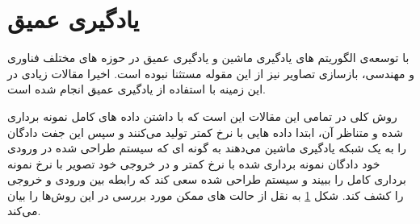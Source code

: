 \FloatBarrier
\section{یادگیری عمیق}\label{ch:literature-review|sec:deep-learning}


با توسعه‌ی الگوریتم های یادگیری ماشین و یادگیری عمیق در حوزه های مختلف فناوری و مهندسی، بازسازی تصاویر \mri نیز از این مقوله مستثنا نبوده است. اخیرا مقالات زیادی در این زمینه با استفاده از یادگیری عمیق انجام شده است. 

\begin{figure}[t!]
	\centering
	\begin{copyrightBox}{\linewidth}{}
	\hspace{0.1\linewidth}
	
	\hspace{0.1\linewidth}
	\end{copyrightBox}
	\removevspace
	\caption{}
	\label{fig:deep-learning-model}
\end{figure}


روش کلی در تمامی این مقالات این است که با داشتن داده های کامل نمونه برداری شده
و \kspace متناظر‌ آن، ابتدا داده هایی با نرخ کمتر تولید می‌کنند و سپس این جفت دادگان را به یک شبکه یاد‌گیری ماشین می‌دهند به گونه ای که سیستم طراحی شده در ورودی خود دادگان \kspace نمونه برداری شده با نرخ کمتر و در خروجی خود تصویر \mri با نرخ نمونه برداری کامل را ببیند و سیستم طراحی شده سعی کند که رابطه بین ورودی و خروجی را کشف کند.
شکل \ref{fig:deep-learning-model}
به نقل از \cite{kSpace-deeplearning2020}
حالت های ممکن مورد بررسی در این روش‌ها را بیان ‌می‌کند.










